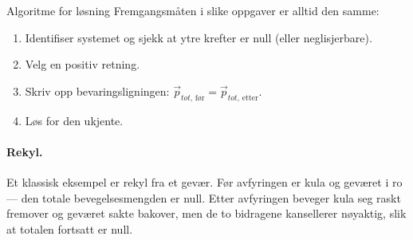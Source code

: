 \begin{myoppsum*}{Algoritme for løsning}
Fremgangsmåten i slike oppgaver er alltid den samme:
\begin{enumerate}
    \item Identifiser systemet og sjekk at ytre krefter er null (eller neglisjerbare).
    \item Velg en positiv retning.
    \item Skriv opp bevaringsligningen: $\vec{p}_{tot,\,\text{før}} = \vec{p}_{tot,\,\text{etter}}$.
    \item Løs for den ukjente.
\end{enumerate}
\end{myoppsum*}


\paragraph*{Rekyl.}
Et klassisk eksempel er rekyl fra et gevær. Før avfyringen er kula og geværet i ro — den totale bevegelsesmengden er null. Etter avfyringen beveger kula seg raskt fremover og geværet sakte bakover, men de to bidragene kansellerer nøyaktig, slik at totalen fortsatt er null.


